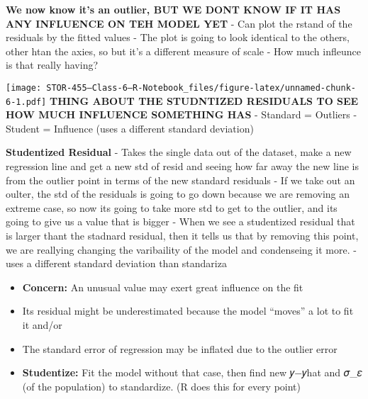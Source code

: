 \documentclass[
]{article}
\newenvironment{Shaded}{\begin{snugshade}}{\end{snugshade}}
\newcommand{\DecValTok}[1]{\textcolor[rgb]{0.00,0.00,0.81}{#1}}
\newcommand{\FunctionTok}[1]{\textcolor[rgb]{0.00,0.00,0.00}{#1}}
\newcommand{\NormalTok}[1]{#1}
\newcommand{\SpecialCharTok}[1]{\textcolor[rgb]{0.00,0.00,0.00}{#1}}
\begin{document}
\textbf{We now know it's an outlier, BUT WE DONT KNOW IF IT HAS ANY
INFLUENCE ON TEH MODEL YET} - Can plot the rstand of the residuals by
the fitted values - The plot is going to look identical to the others,
other htan the axies, so but it's a different measure of scale - How
much infleunce is that really having?

\begin{Shaded}
\end{Shaded}

\texttt{[image: STOR-455---Class-6---R-Notebook\_files/figure-latex/unnamed-chunk-6-1.pdf]}
\textbf{THING ABOUT THE STUDNTIZED RESIDUALS TO SEE HOW MUCH INFLUENCE
SOMETHING HAS} - Standard = Outliers - Student = Influence (uses a
different standard deviation)

\textbf{Studentized Residual} - Takes the single data out of the
dataset, make a new regression line and get a new std of resid and
seeing how far away the new line is from the outlier point in terms of
the new standard residuals - If we take out an oulter, the std of the
residuals is going to go down because we are removing an extreme case,
so now its going to take more std to get to the outlier, and its going
to give us a value that is bigger - When we see a studentized residual
that is larger thant the stadnard residual, then it tells us that by
removing this point, we are reallying changing the varibaility of the
model and condenseing it more. - uses a different standard deviation
than standariza

\begin{itemize}
\item
  \textbf{Concern:} An unusual value may exert great influence on the
  fit
\item
  Its residual might be underestimated because the model ``moves'' a lot
  to fit it and/or
\item
  The standard error of regression may be inflated due to the outlier
  error
\item
  \textbf{Studentize:} Fit the model without that case, then find new
  𝑦−𝑦hat and 𝜎\_𝜀 (of the population) to standardize. (R does this for
  every point)
\end{itemize}
\end{document}
